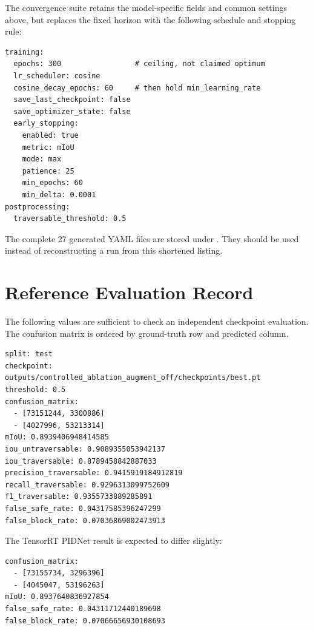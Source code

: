The convergence suite retains the model-specific fields and common settings
above, but replaces the fixed horizon with the following schedule and stopping
rule:

\begin{lstlisting}
training:
  epochs: 300                 # ceiling, not claimed optimum
  lr_scheduler: cosine
  cosine_decay_epochs: 60     # then hold min_learning_rate
  save_last_checkpoint: false
  save_optimizer_state: false
  early_stopping:
    enabled: true
    metric: mIoU
    mode: max
    patience: 25
    min_epochs: 60
    min_delta: 0.0001
postprocessing:
  traversable_threshold: 0.5
\end{lstlisting}

The complete 27 generated YAML files are stored under
.
They should be used instead of reconstructing a run from this shortened
listing.

\chapter{Reference Evaluation Record}
\label{app:expected}

The following values are sufficient to check an independent checkpoint
evaluation. The confusion matrix is ordered by ground-truth row and predicted
column.

\begin{lstlisting}
split: test
checkpoint: outputs/controlled_ablation_augment_off/checkpoints/best.pt
threshold: 0.5
confusion_matrix:
  - [73151244, 3300886]
  - [4027996, 53213314]
mIoU: 0.8939406948414585
iou_untraversable: 0.9089355053942137
iou_traversable: 0.8789458842887033
precision_traversable: 0.9415919184912819
recall_traversable: 0.9296313099752609
f1_traversable: 0.9355733889285891
false_safe_rate: 0.04317585396247299
false_block_rate: 0.07036869002473913
\end{lstlisting}

The TensorRT PIDNet result is expected to differ slightly:

\begin{lstlisting}
confusion_matrix:
  - [73155734, 3296396]
  - [4045047, 53196263]
mIoU: 0.8937640836927854
false_safe_rate: 0.04311712440189698
false_block_rate: 0.07066656930108693
\end{lstlisting}

